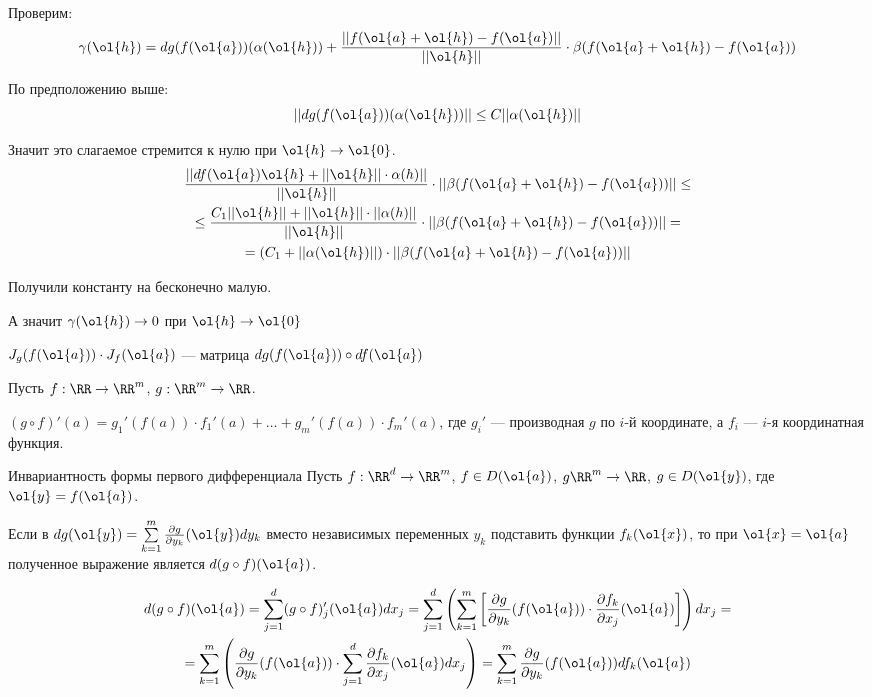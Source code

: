 Проверим:
\[
    \gamma(\ol{h})
    =
    dg ( f(\ol{a}) ) ( \alpha(\ol{h}) )
    +
    \frac{|| f(\ol{a} + \ol{h}) - f(\ol{a}) ||}{|| \ol{h} ||} \cdot \beta (f(\ol{a} + \ol{h}) - f(\ol{a}))
\]

По предположению выше:
\[
    || dg ( f(\ol{a}) ) ( \alpha(\ol{h}) ) || \leq C || \alpha ( \ol{h} ) ||
\]

Значит это слагаемое стремится к нулю при \( \ol{h} \to \ol{0} \).
\begin{gather*}
    \frac{|| df(\ol{a}) \ol{h} + || \ol{h} || \cdot \alpha(h) ||}{|| \ol{h} ||} \cdot || \beta (f(\ol{a} + \ol{h}) - f(\ol{a})) ||
    \leq
    \\
    \leq
    \frac{C_1 || \ol{h} || + || \ol{h} || \cdot || \alpha(h) ||}{|| \ol{h} ||} \cdot || \beta (f(\ol{a} + \ol{h}) - f(\ol{a})) ||
    =
    \\
    =
    (C_1 + || \alpha(\ol{h}) ||) \cdot || \beta (f(\ol{a} + \ol{h}) - f(\ol{a})) ||
\end{gather*}

Получили константу на бесконечно малую.

А значит \( \gamma(\ol{h}) \to 0 \) при \( \ol{h} \to \ol{0} \)

\begin{coroll}{}{}
    \( J_g (f(\ol{a})) \cdot J_f (\ol{a}) \) --- матрица \( dg(f(\ol{a})) \circ df (\ol{a}) \)
\end{coroll}

Пусть \( f : \RR \to \RR^m \), \( g : \RR^m \to \RR \).

\( (g \circ f)' (a) = g_1'(f(a)) \cdot f_1'(a) + \ldots + g_m'(f(a)) \cdot f_m'(a) \),
где \( g_i' \) --- производная \( g \) по \( i \)-й координате, а \( f_i \) --- \( i \)-я координатная функция.

\begin{thrm}{Инвариантность формы первого дифференциала}{}
    Пусть \( f : \RR^d \to \RR^m \), \( f \in D(\ol{a}) \), \( g \RR^m \to \RR \), \( g \in D(\ol{y}) \), где \( \ol{y} = f(\ol{a}) \).

    Если в \( dg(\ol{y}) = \sum\limits_{k = 1}^{m} \frac{\partial g}{\partial y_k} (\ol{y}) dy_k \)
    вместо независимых переменных \( y_k \) подставить функции \( f_k(\ol{x}) \),
    то при \( \ol{x} = \ol{a} \) полученное выражение является \( d(g \circ f)(\ol{a}) \).
\end{thrm}
\begin{gather*}
    d(g \circ f)(\ol{a})
    =
    \sum\limits_{j = 1}^{d} (g \circ f)_j' (\ol{a}) dx_j
    =
    \sum\limits_{j = 1}^{d}
        \left(
            \sum\limits_{k = 1}^{m}
            \left[
                \frac{\partial g}{\partial y_k} (f(\ol{a})) \cdot \frac{\partial f_k}{\partial x_j} (\ol{a})
            \right]
        \right) dx_j
    =
    \\
    =
    \sum\limits_{k = 1}^{m}
        \left(
            \frac{\partial g}{\partial y_k} (f(\ol{a}))
            \cdot
            \sum\limits_{j = 1}^{d}
                 \frac{\partial f_k}{\partial x_j} (\ol{a})
                 dx_j
        \right)
    =
    \sum\limits_{k = 1}^{m} \frac{\partial g}{\partial y_k} (f(\ol{a})) df_k (\ol{a})
\end{gather*}

